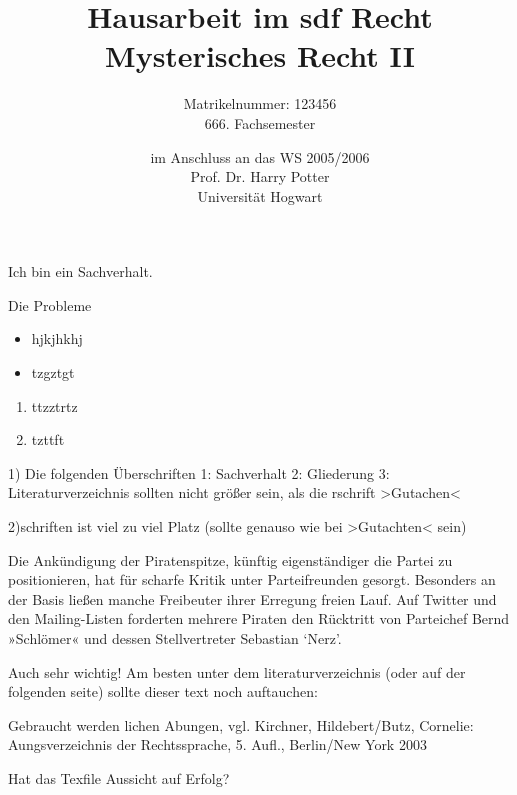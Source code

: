 \documentclass[widefront]{jura}
\begin{document}
\frontmatter
\author{Matrikelnummer: 123456\\
666. Fachsemester}
\title{Hausarbeit im sdf Recht\\
Mysterisches Recht II}
\date{im Anschluss an das WS 2005/2006\\
Prof. Dr. Harry Potter\\
Universität Hogwart}

\maketitle

\begin{sachverhalt}
Ich bin ein Sachverhalt.

Die Probleme

\begin{itemize}
\item hjkjhkhj
\item tzgztgt
\end{itemize}

\begin{enumerate}
\item ttzztrtz
\item tzttft
\end{enumerate}

1)
Die folgenden Überschriften
1: Sachverhalt
2: Gliederung
3: Literaturverzeichnis
sollten nicht größer sein, als die rschrift >Gutachen<

2)schriften ist viel zu viel Platz (sollte genauso wie bei >Gutachten< sein)

Die Ankündigung der Piratenspitze, künftig eigenständiger die Partei zu positionieren, hat für scharfe Kritik unter Parteifreunden gesorgt. Besonders an der Basis ließen manche Freibeuter ihrer Erregung freien Lauf. Auf Twitter und den Mailing-Listen forderten mehrere Piraten den Rücktritt von Parteichef Bernd »Schlömer« und dessen Stellvertreter Sebastian `Nerz'.



Auch sehr wichtig! Am besten unter dem literaturverzeichnis (oder auf der folgenden seite)
sollte dieser text noch auftauchen:


Gebraucht werden lichen Abungen, vgl.
Kirchner, Hildebert/Butz, Cornelie: Aungsverzeichnis der Rechtssprache,
5. Aufl., Berlin/New York 2003


Hat das Texfile Aussicht auf Erfolg?
\end{sachverhalt}

\tableofcontents
\end{document}
